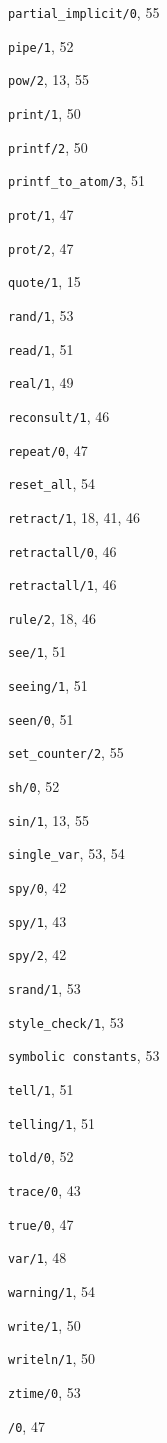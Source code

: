 \begin{theindex}
  \item {\tt partial\_implicit/0}, 55
  \item {\tt pipe/1}, 52
  \item {\tt pow/2}, 13, 55
  \item {\tt print/1}, 50
  \item {\tt printf/2}, 50
  \item {\tt printf\_to\_atom/3}, 51
  \item {\tt prot/1}, 47
  \item {\tt prot/2}, 47
  \item {\tt quote/1}, 15
  \item {\tt rand/1}, 53
  \item {\tt read/1}, 51
  \item {\tt real/1}, 49
  \item {\tt reconsult/1}, 46
  \item {\tt repeat/0}, 47
  \item {\tt reset\_all}, 54
  \item {\tt retract/1}, 18, 41, 46
  \item {\tt retractall/0}, 46
  \item {\tt retractall/1}, 46
  \item {\tt rule/2}, 18, 46
  \item {\tt see/1}, 51
  \item {\tt seeing/1}, 51
  \item {\tt seen/0}, 51
  \item {\tt set\_counter/2}, 55
  \item {\tt sh/0}, 52
  \item {\tt sin/1}, 13, 55
  \item {\tt single\_var}, 53, 54
  \item {\tt spy/0}, 42
  \item {\tt spy/1}, 43
  \item {\tt spy/2}, 42
  \item {\tt srand/1}, 53
  \item {\tt style\_check/1}, 53
  \item {\tt symbolic constants}, 53
  \item {\tt tell/1}, 51
  \item {\tt telling/1}, 51
  \item {\tt told/0}, 52
  \item {\tt trace/0}, 43
  \item {\tt true/0}, 47
  \item {\tt var/1}, 48
  \item {\tt warning/1}, 54
  \item {\tt write/1}, 50
  \item {\tt writeln/1}, 50
  \item {\tt ztime/0}, 53
  \item {\tt {\cut}/0}, 47


\end{theindex}
